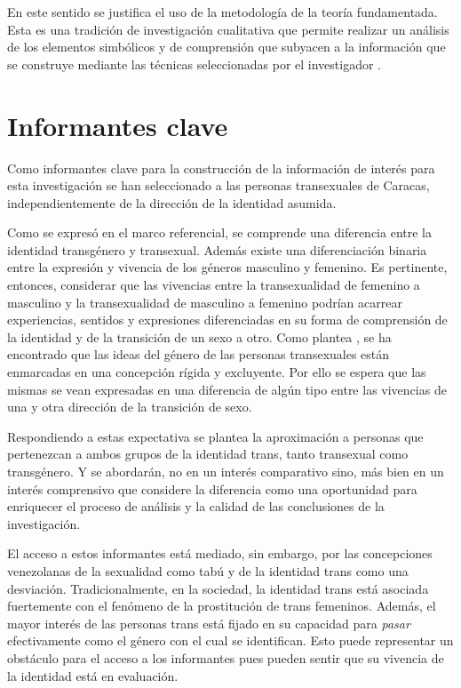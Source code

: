 
	En este sentido se justifica el uso de la metodología de la teoría fundamentada.
Esta es una tradición de investigación cualitativa que permite realizar un
análisis de los elementos simbólicos y de comprensión que subyacen a la
información que se construye mediante las técnicas seleccionadas por el
investigador \parencite{Glaser1967}.

\section{Informantes clave}

	Como informantes clave para la construcción de la
información de interés para esta investigación se han seleccionado a las
personas transexuales de Caracas, independientemente de la dirección de la
identidad asumida.

	Como se expresó en el marco referencial, se comprende una diferencia entre la
identidad transgénero y transexual. Además existe una diferenciación binaria
entre la expresión y vivencia de los géneros masculino y femenino. Es
pertinente, entonces, considerar que las vivencias entre la transexualidad de
femenino a masculino y la transexualidad de masculino a femenino podrían
acarrear experiencias, sentidos y expresiones diferenciadas en su forma de
comprensión de la identidad y de la transición de un sexo a otro. Como plantea
\textcite[][p. 218]{BergeroMiguel2008}, se ha encontrado que las ideas del
género de las
personas transexuales están enmarcadas en una concepción rígida y excluyente.
Por ello se espera que las mismas se vean expresadas en una diferencia de algún
tipo entre las vivencias de una y otra dirección de la transición de sexo.

	Respondiendo a estas expectativa se plantea la aproximación a personas que
pertenezcan a ambos grupos de la identidad trans, tanto transexual como
transgénero. Y se abordarán,
no en un interés comparativo sino, más bien en un interés comprensivo que
considere la diferencia como una oportunidad para enriquecer el proceso de
análisis y la calidad de las conclusiones de la investigación.

	El acceso a estos informantes está mediado, sin embargo, por las concepciones
venezolanas de la sexualidad como tabú y de la identidad trans como una
desviación. Tradicionalmente, en la sociedad, la identidad trans está asociada
fuertemente con el fenómeno de la prostitución de trans femeninos. Además, el
mayor  interés de las personas trans está fijado en su capacidad para
\emph{pasar} efectivamente como el género con el cual se identifican. Esto puede
representar un obstáculo para el acceso a los informantes pues pueden sentir que
su vivencia de la identidad está en evaluación.

